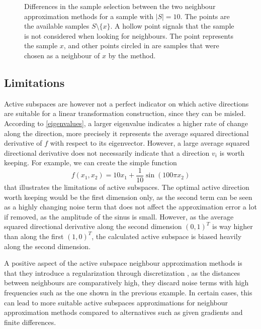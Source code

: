 \documentclass[
  a4paper,  %
  twoside,  %
  bibliography=totoc,
  headsepline,
  cleardoublepage=empty,
  parskip=half,
  draft=false
]{scrbook}
\begin{document}
\begin{mdframed}[style=style]
\begin{figure}[H]
\begin{subfigure}{.45\textwidth}
  \vspace{2mm}
  \label{fig:as_nn}
\end{subfigure}
\delimit
\caption{Differences in the sample selection between the two neighbour approximation methods for a sample with $|S|=10$.
The \darkblue points are the available samples $S \setminus \{x\}$.
A hollow point signals that the sample is not considered when looking for neighbours.
The \red point represents the sample $x$, and other points circled in \red are samples that were chosen as a neighbour of $x$ by the method.}
\label{fig:as_approx}
\end{figure}
\end{mdframed}

\subsection{Limitations}
\label{sec:asl}

Active subspaces are however not a perfect indicator on which active directions are suitable for a linear transformation construction, since they can be misled.
According to \cref{eigenvalues}, a larger eigenvalue indicates a higher rate of change along the direction, more precisely it represents the average squared directional derivative of $f$ with respect to its eigenvector.
However, a large average squared directional derivative does not necessarily indicate that a direction $v_i$ is worth keeping.
For example, we can create the simple function
\begin{equation}
f(x_1, x_2)=10x_1 + \frac{1}{10} \sin(100 \pi x_2)
\end{equation}
that illustrates the limitations of active subspaces.
The optimal active direction worth keeping would be the first dimension only, as the second term can be seen as a highly changing noise term that does not affect the approximation error a lot if removed, as the amplitude of the sinus is small.
However, as the average squared directional derivative along the second dimension $(0,1)^T$ is way higher than along the first $(1,0)^T$, the calculated active subspace is biased heavily along the second dimension.

A positive aspect of the active subspace neighbour approximation methods is that they introduce a regularization through discretization \cite{Kress1999}, \ie as the distances between neighbours are comparatively high, they discard noise terms with high frequencies such as the one shown in the previous example.
In certain cases, this can lead to more suitable active subspaces approximations for neighbour approximation methods compared to alternatives such as given gradients and finite differences.
\end{document}
